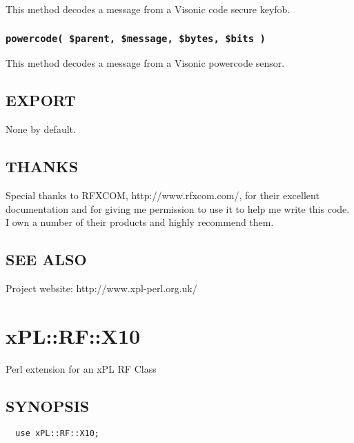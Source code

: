 \documentclass[12pt,a4paper]{article}
\begin{document}
This method decodes a message from a Visonic code secure keyfob.

\subsubsection*{\texttt{powercode( \$parent, \$message, \$bytes, \$bits )}\label{xPL::RF::Visonic_powercode_parent_message_bytes_bits_}}


This method decodes a message from a Visonic powercode sensor.

\subsection*{EXPORT\label{xPL::RF::Visonic_EXPORT}}


None by default.

\subsection*{THANKS\label{xPL::RF::Visonic_THANKS}}


Special thanks to RFXCOM, \textsf{http://www.rfxcom.com/}, for their
excellent documentation and for giving me permission to use it to help
me write this code.  I own a number of their products and highly
recommend them.

\subsection*{SEE ALSO\label{xPL::RF::Visonic_SEE_ALSO}}


Project website: http://www.xpl-perl.org.uk/

\newpage
\section{xPL::RF::X10\label{xPL::RF::X10}}


Perl extension for an xPL RF Class

\subsection*{SYNOPSIS\label{xPL::RF::X10_SYNOPSIS}}
\begin{verbatim}
  use xPL::RF::X10;
\end{verbatim}
\end{document}
